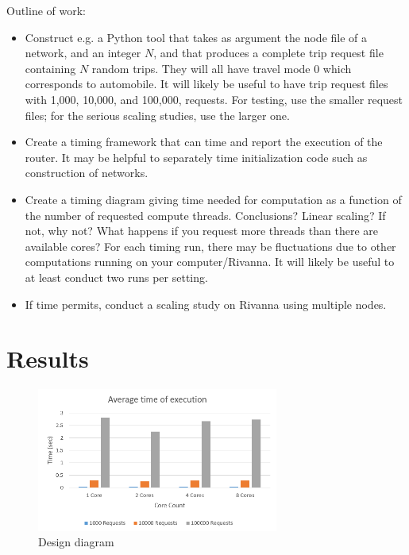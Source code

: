 \documentclass[English]{article}
\theoremstyle{remark}
\numberwithin{equation}{section}
\begin{document}
Outline of work:
\begin{itemize}
\item Construct e.g. a Python tool that takes as argument the node
  file of a network, and an integer $N$, and that produces a complete
  trip request file containing $N$ random trips. They will all have
  travel mode $0$ which corresponds to automobile. It will likely be
  useful to have trip request files with 1,000, 10,000, and 100,000, requests. For testing, use the smaller request files;
  for the serious scaling studies, use the larger one.
\item Create a timing framework that can time and report the execution
  of the router. It may be helpful to separately time initialization
  code such as construction of networks.
\item Create a timing diagram giving time needed for computation as a
  function of the number of requested compute threads. Conclusions?
  Linear scaling? If not, why not? What happens if you request more
  threads than there are available cores? For each timing run, there
  may be fluctuations due to other computations running on your
  computer/Rivanna. It will likely be useful to at least conduct two
  runs per setting.
\item If time permits, conduct a scaling study on Rivanna using
  multiple nodes.

\end{itemize}

\section{Results}
\label{sec:results}
\begin{figure}[H]
    \centering
    \includegraphics[width=300]{data.png}
    \caption{Design diagram}
    \label{fig:design1}
\end{figure}
\end{document}
